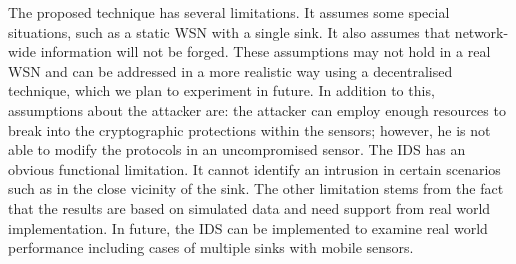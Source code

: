 \documentclass{CRPITStyle}
\begin{document}
The proposed technique has several limitations. 
It assumes some special situations, such as a static WSN with a single sink.
It also assumes that network-wide information will not be forged. %
These assumptions may not hold in a real WSN and can be addressed in a more realistic way using a decentralised technique, which we plan to experiment in future.
In addition to this, assumptions about the attacker are: the attacker can employ enough resources to break into the cryptographic protections within the sensors; however, he is not able to modify the protocols in an uncompromised sensor.
The IDS has an obvious functional limitation.
It cannot identify an intrusion in certain scenarios such as 
in the close vicinity of the sink.%
The other limitation stems from the fact that the results are based on simulated data and need support from real world implementation.
In future,  the IDS can be implemented to examine real world performance including cases of multiple sinks with mobile sensors.




\end{document}

